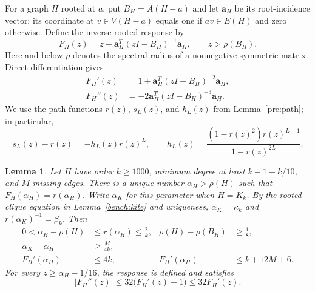 \documentclass[11pt,a4paper]{article}
\numberwithin{equation}{section}
\newtheorem{lemma}[theorem]{Lemma}
\theoremstyle{definition}
\theoremstyle{remark}
\begin{document}
For a graph $H$ rooted at $a$, put $B_H=A(H-a)$ and let
$\mathbf a_H$ be its root-incidence vector: its coordinate at
$v\in V(H-a)$ equals one if $av\in E(H)$ and zero otherwise.
Define the inverse rooted response by
\begin{equation}\label{dense:response}
 F_H(z)=z-\mathbf a_H^T(zI-B_H)^{-1}\mathbf a_H,
 \qquad z>\rho(B_H).
\end{equation}
Here and below $\rho$ denotes the spectral radius of a nonnegative
symmetric matrix.  Direct differentiation gives
\begin{equation}\label{dense:response-derivatives}
 \begin{split}
 F_H'(z)&=1+\mathbf a_H^T(zI-B_H)^{-2}\mathbf a_H,\\
 F_H''(z)&=-2\mathbf a_H^T(zI-B_H)^{-3}\mathbf a_H.
 \end{split}
\end{equation}
We use the path functions $r(z)$, $s_L(z)$, and $h_L(z)$ from
Lemma~\ref{pre:path}; in particular,
\begin{equation}\label{dense:path-identity}
 s_L(z)-r(z)=-h_L(z)r(z)^L,
 \qquad
 h_L(z)=\frac{(1-r(z)^2)r(z)^{L-1}}{1-r(z)^{2L}}.
\end{equation}

\begin{lemma}\label{dense:core-estimates}
Let $H$ have order $k\ge1000$, minimum degree at least $k-1-k/10$,
and $M$ missing edges.  There is a unique number
$\alpha_H>\rho(H)$ such that $F_H(\alpha_H)=r(\alpha_H)$.
Write $\alpha_K$ for this parameter when $H=K_k$. By the rooted
clique equation in Lemma~\ref{bench:kite} and uniqueness,
$\alpha_K=\kappa_k$ and $r(\alpha_K)^{-1}=\beta_k$. Then
\begin{align}
 0<\alpha_H-\rho(H)&\le r(\alpha_H)\le\frac2k,
 &\rho(H)-\rho(B_H)&\ge\frac18,
 \label{dense:root-gap}\\
 \alpha_K-\alpha_H&\ge\frac{M}{4k},
 \label{dense:missing-deficit}\\
 F_H'(\alpha_H)&\le4k,
 &F_H'(\alpha_H)&\le k+12M+6.
 \label{dense:slope}
\end{align}
For every $z\ge\alpha_H-1/16$, the response is defined and satisfies
\begin{equation}\label{dense:log-slope}
 |F_H''(z)|\le32\bigl(F_H'(z)-1\bigr)\le32F_H'(z).
\end{equation}
\end{lemma}
\end{document}
